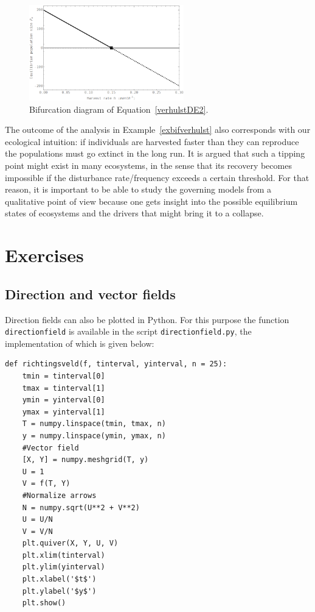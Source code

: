 \begin{example}
\begin{figure}[H]
	\begin{center}
			\includegraphics[width=0.6\textwidth]{bifurcatiediagcverhulst}
	\caption{Bifurcation diagram of Equation~\eqref{verhulstDE2}.}
	\label{bifurcatiediagcverhulst}
	\end{center}
\end{figure}


\end{example}


The outcome of the analysis in Example~\ref{exbifverhulst} also corresponds with our ecological intuition: if individuals are harvested faster than they can reproduce the populations must go extinct in the long run. It is argued that such a tipping point might exist in many ecosystems, in the sense that its recovery becomes impossible if the disturbance rate/frequency exceeds a certain threshold. For that reason, it is important to be able to study the governing models from a qualitative point of view because one gets insight into the possible equilibrium states of ecosystems and the drivers that might bring it to a collapse. 


\newpage
\section{Exercises} %
\subsection{Direction and vector fields}

Direction fields can also be plotted in Python. For this purpose the function \texttt{directionfield} is available in the script \texttt{directionfield.py}, the implementation of which is given below:
\begin{lstlisting}
def richtingsveld(f, tinterval, yinterval, n = 25):  
    tmin = tinterval[0]
    tmax = tinterval[1]
    ymin = yinterval[0]
    ymax = yinterval[1]
    T = numpy.linspace(tmin, tmax, n)
    y = numpy.linspace(ymin, ymax, n)
    #Vector field
    [X, Y] = numpy.meshgrid(T, y)
    U = 1
    V = f(T, Y)
    #Normalize arrows
    N = numpy.sqrt(U**2 + V**2)  
    U = U/N
    V = V/N
    plt.quiver(X, Y, U, V)    
    plt.xlim(tinterval)
    plt.ylim(yinterval)
    plt.xlabel('$t$')
    plt.ylabel('$y$')
    plt.show()
\end{lstlisting}


